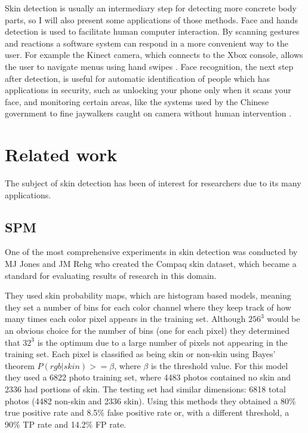 \documentclass[12pt]{article}
\begin{document}
	Skin detection is usually an intermediary step for detecting more concrete body parts, so I will also present some applications of those methods. Face and hands detection is used to facilitate human computer interaction. By scanning gestures and reactions a software system can respond in a more convenient way to the user. For example the Kinect camera, which connects to the Xbox console,
	allows the user to navigate menus using hand swipes \cite{kinect_control}. Face recognition, the next step after detection, is useful for automatic identification of people \cite{detecting_faces_a_survey} which has applications in security, such as unlocking your phone only when it scans your face, and monitoring certain areas, like the systems used by the Chinese government to fine jaywalkers caught on camera without human intervention \cite{jaywalkers_china}.
	
	\section{Related work}
	The subject of skin detection has been of interest for researchers due to its many applications. 
	
	\subsection{SPM}
	One of the most comprehensive experiments in skin detection was conducted by MJ Jones and JM Rehg \cite{compaq} who created the Compaq skin dataset, which became a standard for evaluating results of research in this domain.
	
	They used skin probability maps, which are histogram based models, meaning they set a number of bins for each color channel where they keep track of how many times each color pixel appears in the training set. Although \(256^3\) would be an obvious choice for the number of bins (one for each pixel) they determined that \(32^3\) is the optimum due to a large number of pixels not appearing in the training set. Each pixel is classified as being skin or non-skin using Bayes' theorem \(P(rgb|skin) >= \beta\), where $\beta$ is the threshold value. For this model they used a 6822 photo training set, where 4483 photos contained no skin and 2336 had portions of skin. The testing set had similar dimensions: 6818 total photos (4482 non-skin and 2336 skin). Using this methods they obtained a 80\% true positive rate and 8.5\% false positive rate or, with a different threshold, a 90\% TP rate and 14.2\% FP rate.
	
\end{document}
